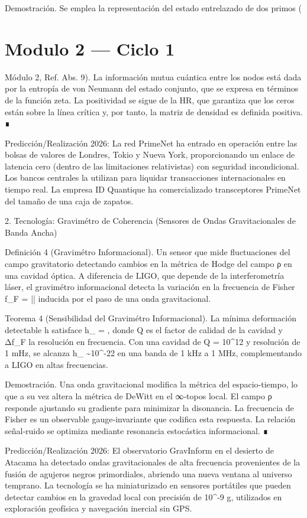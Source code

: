 \documentclass[12pt,twoside]{book}
\begin{document}
Demostración. Se emplea la representación del estado entrelazado de dos primos (

\chapter{Modulo 2 — Ciclo 1}
Módulo 2, Ref. Abs. 9). La información mutua cuántica entre los nodos está dada por la entropía de von Neumann del estado conjunto, que se expresa en términos de la función zeta. La positividad se sigue de la HR, que garantiza que los ceros están sobre la línea crítica y, por tanto, la matriz de densidad es definida positiva. ∎

Predicción/Realización 2026: La red PrimeNet ha entrado en operación entre las bolsas de valores de Londres, Tokio y Nueva York, proporcionando un enlace de latencia cero (dentro de las limitaciones relativistas) con seguridad incondicional. Los bancos centrales la utilizan para liquidar transacciones internacionales en tiempo real. La empresa ID Quantique ha comercializado transceptores PrimeNet del tamaño de una caja de zapatos.

2. Tecnología: Gravimétro de Coherencia (Sensores de Ondas Gravitacionales de Banda Ancha)

Definición 4 (Gravimétro Informacional). Un sensor que mide fluctuaciones del campo gravitatorio detectando cambios en la métrica de Hodge del campo ρ en una cavidad óptica. A diferencia de LIGO, que depende de la interferometría láser, el gravimétro informacional detecta la variación en la frecuencia de Fisher  f_F = |\nabla \ln \rho|  inducida por el paso de una onda gravitacional.

Teorema 4 (Sensibilidad del Gravimétro Informacional). La mínima deformación detectable h satisface  h_{\min} =   , donde Q es el factor de calidad de la cavidad y Δf_F la resolución en frecuencia. Con una cavidad de Q = 10^{12} y resolución de 1 mHz, se alcanza  h_{\min} \sim 10^{-22}  en una banda de 1 kHz a 1 MHz, complementando a LIGO en altas frecuencias.

Demostración. Una onda gravitacional modifica la métrica del espacio‑tiempo, lo que a su vez altera la métrica de DeWitt en el ∞‑topos local. El campo ρ responde ajustando su gradiente para minimizar la disonancia. La frecuencia de Fisher es un observable gauge‑invariante que codifica esta respuesta. La relación señal‑ruido se optimiza mediante resonancia estocástica informacional. ∎

Predicción/Realización 2026: El observatorio GravInform en el desierto de Atacama ha detectado ondas gravitacionales de alta frecuencia provenientes de la fusión de agujeros negros primordiales, abriendo una nueva ventana al universo temprano. La tecnología se ha miniaturizado en sensores portátiles que pueden detectar cambios en la gravedad local con precisión de 10^{-9} g, utilizados en exploración geofísica y navegación inercial sin GPS.
\end{document}
